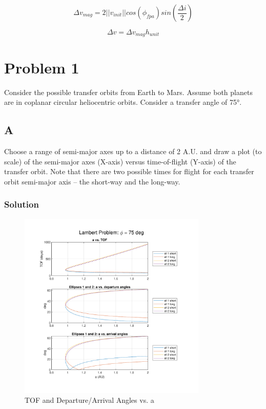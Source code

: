 \documentclass[conf]{new-aiaa}
\begin{document}
\begin{equation}
    \Delta v_{mag} = 2 || v_{init} || cos(\phi_{fpa}) sin(\frac{\Delta i}{2})
\end{equation}

\begin{equation}
    \Delta v = \Delta v_{mag} h_{unit}
\end{equation}


\newpage 
\section*{Problem 1}

Consider the possible transfer orbits from Earth to
Mars. Assume both planets are in coplanar circular heliocentric orbits. Consider a transfer
angle of 75°. 

\subsection*{A}

Choose a range of semi-major axes up to a distance of 2 A.U. and draw a plot (to
scale) of the semi-major axes (X-axis) versus time-of-flight (Y-axis) of the
transfer orbit. Note that there are two possible times for flight for each transfer
orbit semi-major axis – the short-way and the long-way.

\subsubsection*{Solution}

\begin{figure}[H]
	\centering 
	\includegraphics[width=0.8\textwidth]{phi75_Ellipse 1 and 2 TOF and Angles.pdf}
	\caption{TOF and Departure/Arrival Angles vs. a}
	\label{fig:TOF_angles_a}
\end{figure}
\end{document}
